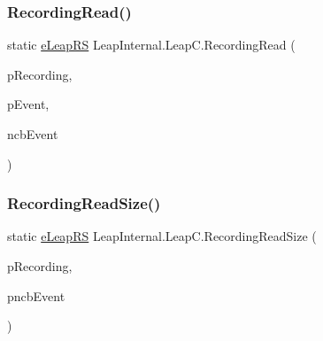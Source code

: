 \mbox{\label{class_leap_internal_1_1_leap_c_af4b4e7cdc79f5f72df507cfbb6b31f94}} 
\subsubsection{\texorpdfstring{RecordingRead()}{RecordingRead()}}
{\footnotesize\ttfamily static \mbox{\hyperlink{namespace_leap_internal_ae50b07d24c508b84273392b6dcbea1d9}{e\+Leap\+RS}} Leap\+Internal.\+Leap\+C.\+Recording\+Read (\begin{DoxyParamCaption}\item[{Int\+Ptr}]{p\+Recording,  }\item[{ref \mbox{\hyperlink{struct_leap_internal_1_1_l_e_a_p___t_r_a_c_k_i_n_g___e_v_e_n_t}{L\+E\+A\+P\+\_\+\+T\+R\+A\+C\+K\+I\+N\+G\+\_\+\+E\+V\+E\+NT}}}]{p\+Event,  }\item[{U\+Int64}]{ncb\+Event }\end{DoxyParamCaption})}

\mbox{\label{class_leap_internal_1_1_leap_c_ad882a574cac8bf2608c780390c9b77b3}} 
\subsubsection{\texorpdfstring{RecordingReadSize()}{RecordingReadSize()}}
{\footnotesize\ttfamily static \mbox{\hyperlink{namespace_leap_internal_ae50b07d24c508b84273392b6dcbea1d9}{e\+Leap\+RS}} Leap\+Internal.\+Leap\+C.\+Recording\+Read\+Size (\begin{DoxyParamCaption}\item[{Int\+Ptr}]{p\+Recording,  }\item[{ref U\+Int64}]{pncb\+Event }\end{DoxyParamCaption})}

\mbox{\label{class_leap_internal_1_1_leap_c_aeca4b745c2d299d8315077c5d047ce43}} 
